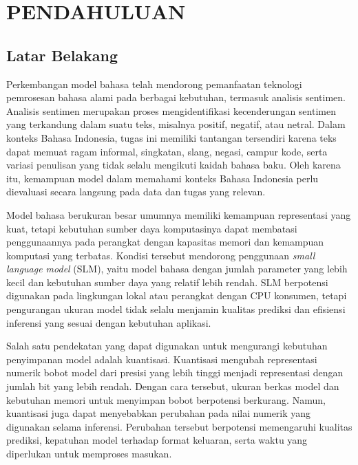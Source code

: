 \chapter{PENDAHULUAN}

\section{Latar Belakang}

Perkembangan model bahasa telah mendorong pemanfaatan teknologi pemrosesan bahasa alami pada berbagai kebutuhan, termasuk analisis sentimen. Analisis sentimen merupakan proses mengidentifikasi kecenderungan sentimen yang terkandung dalam suatu teks, misalnya positif, negatif, atau netral. Dalam konteks Bahasa Indonesia, tugas ini memiliki tantangan tersendiri karena teks dapat memuat ragam informal, singkatan, slang, negasi, campur kode, serta variasi penulisan yang tidak selalu mengikuti kaidah bahasa baku. Oleh karena itu, kemampuan model dalam memahami konteks Bahasa Indonesia perlu dievaluasi secara langsung pada data dan tugas yang relevan.

Model bahasa berukuran besar umumnya memiliki kemampuan representasi yang kuat, tetapi kebutuhan sumber daya komputasinya dapat membatasi penggunaannya pada perangkat dengan kapasitas memori dan kemampuan komputasi yang terbatas. Kondisi tersebut mendorong penggunaan \textit{small language model} (SLM), yaitu model bahasa dengan jumlah parameter yang lebih kecil dan kebutuhan sumber daya yang relatif lebih rendah. SLM berpotensi digunakan pada lingkungan lokal atau perangkat dengan CPU konsumen, tetapi pengurangan ukuran model tidak selalu menjamin kualitas prediksi dan efisiensi inferensi yang sesuai dengan kebutuhan aplikasi.

Salah satu pendekatan yang dapat digunakan untuk mengurangi kebutuhan penyimpanan model adalah kuantisasi. Kuantisasi mengubah representasi numerik bobot model dari presisi yang lebih tinggi menjadi representasi dengan jumlah bit yang lebih rendah. Dengan cara tersebut, ukuran berkas model dan kebutuhan memori untuk menyimpan bobot berpotensi berkurang. Namun, kuantisasi juga dapat menyebabkan perubahan pada nilai numerik yang digunakan selama inferensi. Perubahan tersebut berpotensi memengaruhi kualitas prediksi, kepatuhan model terhadap format keluaran, serta waktu yang diperlukan untuk memproses masukan.

